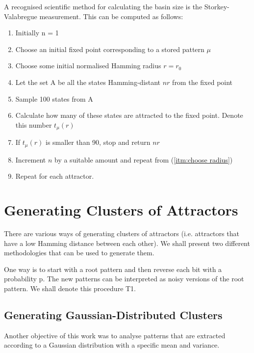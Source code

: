  A recognised scientific method for calculating the basin size is the Storkey-Valabregue measurement. This can be computed as follows:

 \begin{enumerate}
  \item Initially n = 1
  \item Choose an initial fixed point corresponding to a stored pattern \(\mu\)
  \item \label{itm:choose radius} Choose some initial normalised Hamming radius \(r=r_{0}\)
  \item Let the set A be all the states Hamming-distant \( nr \) from the fixed point
  \item Sample 100 states from A
  \item Calculate how many of these states are attracted to the fixed point. Denote this number \( t_{\mu}(r) \)
  \item If \( t_{\mu}(r) \) is smaller than 90, stop and return \(nr\)
  \item Increment \(n\) by a suitable amount and repeat from (\ref{itm:choose radius})
  \item Repeat for each attractor.
 \end{enumerate}



\section{Generating Clusters of Attractors}

There are various ways of generating clusters of attractors (i.e. attractors that have a low Hamming distance between each other). We shall present two different methodologies that can be used to generate them.

One way is to start with a root pattern and then reverse each bit with a probability p. The new patterns can be interpreted as noisy versions of the root pattern. We shall denote this procedure T1.

\subsection{Generating Gaussian-Distributed Clusters}

Another objective of this work was to analyse patterns that are extracted according to a Gaussian distribution with a specific mean and variance.

